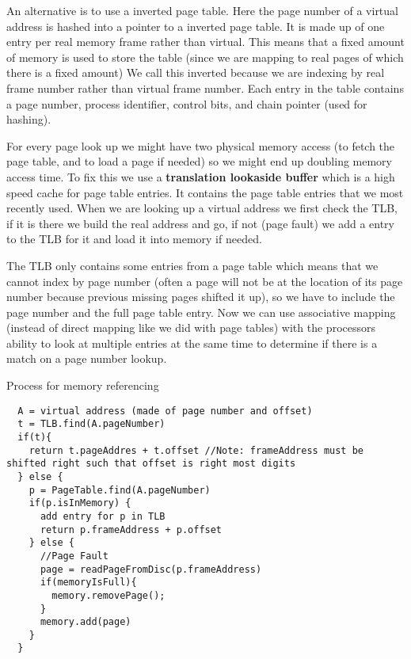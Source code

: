 \documentclass[12pt]{article}
\begin{document}
An alternative is to use a inverted page table. Here the page number of a virtual address is hashed into a pointer to a inverted page table. It is made up of one entry per real memory frame rather than virtual. This means that a fixed amount of memory is used to store the table (since we are mapping to real pages of which there is a fixed amount) We call this inverted because we are indexing by real frame number rather than virtual frame number. Each entry in the table contains a page number, process identifier, control bits, and chain pointer (used for hashing).

For every page look up we might have two physical memory access (to fetch the page table, and to load a page if needed) so we might end up doubling memory access time. To fix this we use a \textbf{translation lookaside buffer} which is a high speed cache for page table entries. It contains the page table entries that we most recently used. When we are looking up a virtual address we first check the TLB, if it is there we build the real address and go, if not (page fault) we add a entry to the TLB for it and load it into memory if needed.

The TLB only contains some entries from a page table which means that we cannot index by page number (often a page will not be at the location of its page number because previous missing pages shifted it up), so we have to include the page number and the full page table entry. Now we can use associative mapping (instead of direct mapping like we did with page tables) with the processors ability to look at multiple entries at the same time to determine if there is a match on a page number lookup.

Process for memory referencing
\begin{verbatim}
  A = virtual address (made of page number and offset)
  t = TLB.find(A.pageNumber)
  if(t){
    return t.pageAddres + t.offset //Note: frameAddress must be shifted right such that offset is right most digits
  } else {
    p = PageTable.find(A.pageNumber)
    if(p.isInMemory) {
      add entry for p in TLB
      return p.frameAddress + p.offset
    } else {
      //Page Fault
      page = readPageFromDisc(p.frameAddress)
      if(memoryIsFull){
        memory.removePage();
      }
      memory.add(page)
    }
  }
\end{verbatim}
\end{document}
